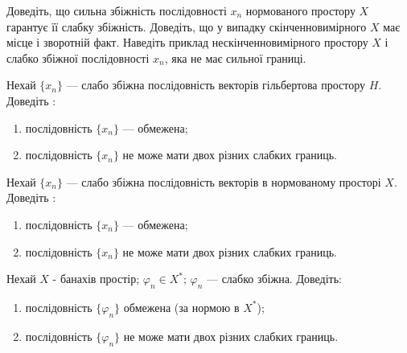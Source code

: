 \begin{exercise}
    Доведіть, що сильна збіжність послідовності $x_n$ нормованого простору $X$ гарантує 
    її слабку збіжність. Доведіть, що у випадку скінченновимірного $X$ має місце і зворотній 
    факт. Наведіть приклад нескінченновимірного простору $X$ і слабко збіжної послідовності 
    $x_n$, яка не має сильної границі.
\end{exercise}

\begin{exercise}
    Нехай $\{x_n\}$ --- слабо збіжна послідовність векторів гільбертова простору $H$. 
    Доведіть : 
    \begin{enumerate}[label=\ukr*)]
        \item послідовність $\{x_n\}$ --- обмежена;
        \item послідовність $\{x_n\}$ не може мати двох різних слабких 
        границь.
    \end{enumerate}
\end{exercise}

\begin{exercise}
    Нехай $\{x_n\}$ --- слабо збіжна послідовність векторів в нормованому 
    просторі $X$. Доведіть :
    \begin{enumerate}[label=\ukr*)]
        \item послідовність $\{x_n\}$ --- обмежена;
        \item послідовність $\{x_n\}$ не може мати двох різних 
        слабких границь.
    \end{enumerate}
\end{exercise}

\begin{exercise}
    Нехай $X$ - банахів простір; $\varphi_n \in X^*$; $\varphi_n$ --- 
    слабко збіжна. Доведіть:
    \begin{enumerate}[label=\ukr*)]
        \item послідовність $\{\varphi_n\}$ обмежена (за нормою в $X^*$);
        \item послідовність $\{\varphi_n\}$ не може мати двох різних слабких 
        границь.
    \end{enumerate}
\end{exercise}

